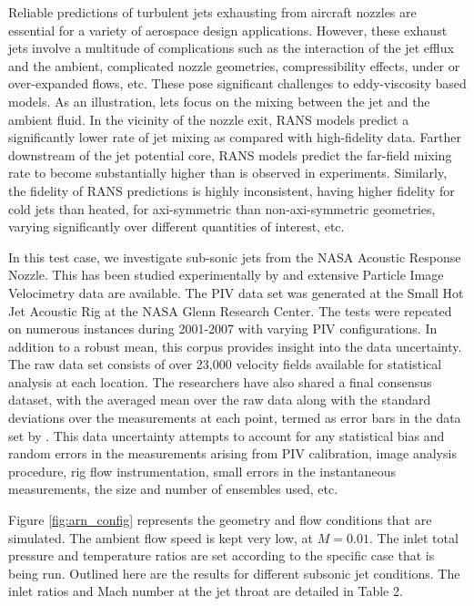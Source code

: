 Reliable predictions of turbulent jets exhausting from aircraft nozzles are essential for a variety of aerospace design applications. However, these exhaust jets involve a multitude of complications such as the interaction of the jet efflux and the ambient, complicated nozzle geometries, compressibility effects, under or over-expanded flows, etc. These pose significant challenges to eddy-viscosity based models. As an illustration, lets focus on the mixing between the jet and the ambient fluid. In the vicinity of the nozzle exit, RANS models predict a significantly lower rate of jet mixing as compared with high-fidelity data. Farther downstream of the jet potential core, RANS models predict the far-field mixing rate to become substantially higher than is observed in experiments. Similarly, the fidelity of RANS predictions is highly inconsistent, having higher fidelity for cold jets than heated, for axi-symmetric than non-axi-symmetric geometries, varying significantly over different quantities of interest, etc. 

In this test case, we investigate sub-sonic jets from the NASA Acoustic Response Nozzle. This has been studied experimentally by \cite{nasajet} and extensive Particle Image Velocimetry data are available. The PIV data set was generated at the Small Hot Jet Acoustic Rig at the NASA Glenn Research Center. The tests were repeated on numerous instances during 2001-2007 with varying PIV configurations. In addition to a robust mean, this corpus provides insight into the data uncertainty. The raw data set consists of over 23,000 velocity fields available for statistical analysis at each location. The researchers have also shared a final consensus dataset, with the averaged mean over the raw data along with the standard deviations over the measurements at each point, termed as error bars in the data set by \cite{nasajet}. This data uncertainty attempts to account for any statistical bias and random errors in the measurements arising from PIV calibration, image analysis procedure, rig flow instrumentation, small errors in the instantaneous measurements, the size and number of ensembles used, etc. 

Figure \ref{fig:arn_config} represents the geometry and flow conditions that are simulated. The ambient flow speed is kept very low, at $M = 0.01$. The inlet total pressure and temperature ratios are set according to the specific case that is being run. Outlined here are the results for different subsonic jet conditions. The inlet ratios and Mach number at the jet throat are detailed in Table 2.


